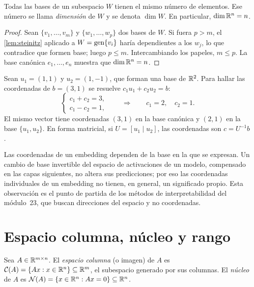 \begin{teorema}[Dimensión]\label{teo:dimension}
Todas las bases de un subespacio $W$ tienen el mismo número de elementos. Ese número se llama \emph{dimensión} de $W$ y se denota $\dim W$. En particular, $\dim\mathbb{R}^{n}=n$.
\end{teorema}

\begin{proof}
Sean $\{v_1,\dots,v_m\}$ y $\{w_1,\dots,w_p\}$ dos bases de $W$. Si fuera $p>m$, el \cref{lem:steinitz} aplicado a $W=\operatorname{gen}\{v_i\}$ haría dependientes a los $w_j$, lo que contradice que formen base; luego $p\le m$. Intercambiando los papeles, $m\le p$. La base canónica $e_1,\dots,e_n$ muestra que $\dim\mathbb{R}^{n}=n$.
\end{proof}

\begin{ejemplo}\label{ej:coordenadas}
Sean $u_1=(1,1)$ y $u_2=(1,-1)$, que forman una base de $\mathbb{R}^{2}$. Para hallar las coordenadas de $b=(3,1)$ se resuelve $c_1u_1+c_2u_2=b$:
\[
\begin{cases} c_1+c_2=3,\\ c_1-c_2=1,\end{cases}\qquad\Longrightarrow\qquad c_1=2,\quad c_2=1.
\]
El mismo vector tiene coordenadas $(3,1)$ en la base canónica y $(2,1)$ en la base $\{u_1,u_2\}$. En forma matricial, si $U=[u_1\mid u_2]$, las coordenadas son $c=U^{-1}b$.
\end{ejemplo}

\begin{observacion}
Las coordenadas de un embedding dependen de la base en la que se expresan. Un cambio de base invertible del espacio de activaciones de un modelo, compensado en las capas siguientes, no altera sus predicciones; por eso las coordenadas individuales de un embedding no tienen, en general, un significado propio. Esta observación es el punto de partida de los métodos de interpretabilidad del módulo~23, que buscan direcciones del espacio y no coordenadas.
\end{observacion}

\section{Espacio columna, núcleo y rango}

\begin{definicion}
Sea $A\in\mathbb{R}^{m\times n}$. El \emph{espacio columna} (o imagen) de $A$ es $\mathcal{C}(A)=\{Ax : x\in\mathbb{R}^{n}\}\subseteq\mathbb{R}^{m}$, el subespacio generado por sus columnas. El \emph{núcleo} de $A$ es $\mathcal{N}(A)=\{x\in\mathbb{R}^{n}: Ax=0\}\subseteq\mathbb{R}^{n}$.
\end{definicion}

